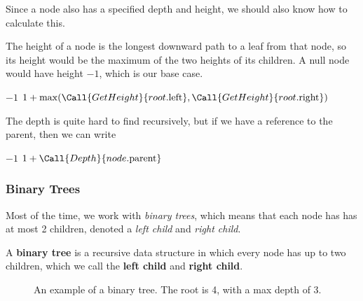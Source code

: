   Since a node also has a specified depth and height, we should also know how to calculate this. 

  \begin{algo}
    The height of a node is the longest downward path to a leaf from that node, so its height would be the maximum of the two heights of its children. A null node would have height $-1$, which is our base case. 
    \begin{algorithmic}[1]
        \State \Return $-1$
      \EndIf
      \State \Return $1 + \max(\Call{GetHeight}{root.\text{left}}, \Call{GetHeight}{root.\text{right}})$
    \EndProcedure
    \end{algorithmic}
  \end{algo}

  \begin{algo}
    The depth is quite hard to find recursively, but if we have a reference to the parent, then we can write 
    \begin{algorithmic}[1]
        \State \Return $-1$
      \Else
        \State \Return $1 + \Call{Depth}{node.\text{parent}}$
      \EndIf
    \EndProcedure
    \end{algorithmic}
  \end{algo}

\subsubsection{Binary Trees} 

  Most of the time, we work with \textit{binary trees}, which means that each node has has at most 2 children, denoted a \textit{left child} and \textit{right child}. 

  \begin{definition}
    A \textbf{binary tree} is a recursive data structure in which every node has up to two children, which we call the \textbf{left child} and \textbf{right child}. 

    \begin{figure}[H]
      \centering 
      \caption{An example of a binary tree. The root is 4, with a max depth of 3. } 
      \label{fig:binary_tree}
    \end{figure}
  \end{definition} 

